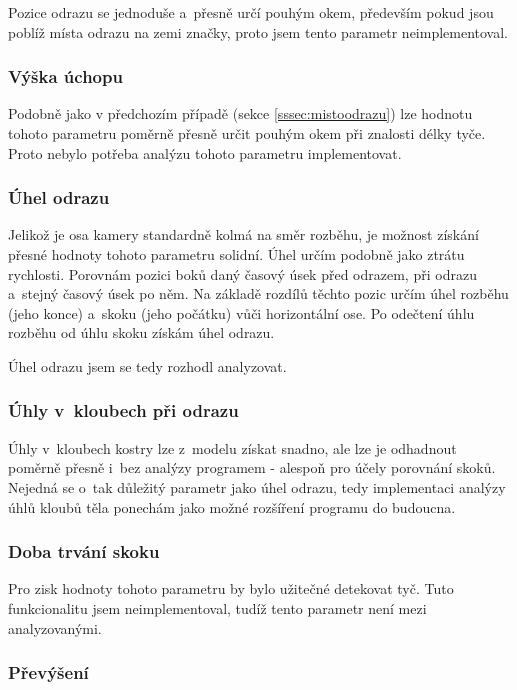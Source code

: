 Pozice odrazu se jednoduše a~přesně určí pouhým okem, především pokud jsou poblíž místa odrazu na zemi značky, proto jsem tento parametr neimplementoval.

\subsubsection{Výška úchopu}

Podobně jako v předchozím případě (sekce \ref{sssec:mistoodrazu}) lze hodnotu tohoto parametru poměrně přesně určit pouhým okem při znalosti délky tyče. Proto nebylo potřeba analýzu tohoto parametru implementovat.

\subsubsection{Úhel odrazu}

Jelikož je osa kamery standardně kolmá na směr rozběhu, je možnost získání přesné hodnoty tohoto parametru solidní. Úhel určím podobně jako ztrátu rychlosti. Porovnám pozici boků daný časový úsek před odrazem, při odrazu a~stejný časový úsek po něm. Na základě rozdílů těchto pozic určím úhel rozběhu (jeho konce) a~skoku (jeho počátku) vůči horizontální ose. Po odečtení úhlu rozběhu od úhlu skoku získám úhel odrazu.

Úhel odrazu jsem se tedy rozhodl analyzovat.

\subsubsection{Úhly v~kloubech při odrazu}

Úhly v~kloubech kostry lze z~modelu získat snadno, ale lze je odhadnout poměrně přesně i~bez analýzy programem - alespoň pro účely porovnání skoků. Nejedná se o~tak důležitý parametr jako úhel odrazu, tedy implementaci analýzy úhlů kloubů těla ponechám jako možné rozšíření programu do budoucna.

\subsubsection{Doba trvání skoku}

Pro zisk hodnoty tohoto parametru by bylo užitečné detekovat tyč. Tuto funkcionalitu jsem neimplementoval, tudíž tento parametr není mezi analyzovanými.

\subsubsection{Převýšení}

